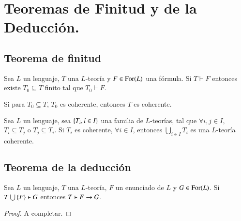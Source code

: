 
\chapter{Teoremas de Finitud y de la Deducci\'on.}

\section{Teorema de finitud}

\begin{thm}\label{thm:tf}
    Sea $L$ un lenguaje, $T$ una $L$-teoría y $F \in \mathrm{For}(L)$ una fórmula. Si $T \vdash F$ entonces existe $T_0 \subseteq T$ finito tal que $T_0 \vdash F$.
\end{thm}

\begin{cor}
    Si para $T_0 \subseteq T$, $T_0$ es coherente, entonces $T$ es coherente.
\end{cor}

\begin{cor}
    Sea $L$ un lenguaje, sea $\left\{T_i, i\in I\right\}$ una familia de $L$-teorías, tal que $\forall i, j\in I$, $T_i \subseteq T_j$ o $T_j \subseteq T_i$. Si $T_i$ es coherente, $\forall i \in I$, entonces $\bigcup_{i\in I} T_i$ es una $L$-teoría coherente.
\end{cor}

\section{Teorema de la deducci\'on}

\begin{thm}
    Sea $L$ un lenguaje, $T$ una $L$-teoría, $F$ un enunciado de $L$ y $G \in \mathrm{For}(L)$. Si $T \bigcup \left\{F\right\} \vdash G$ entonces $T \vdash F \rightarrow G$.
\end{thm}

\begin{proof}
    A completar. %
\end{proof}
